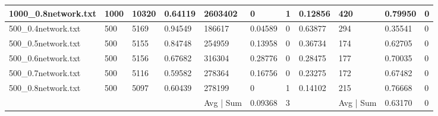 \begin{sidewaystable}
\begin{tabular}{lllllllllll}
		\multicolumn{1}{|l|}{1000\_0.8network.txt} & \multicolumn{1}{l|}{1000} & \multicolumn{1}{l|}{10320} & \multicolumn{1}{l|}{0.64119} & \multicolumn{1}{l|}{2603402} & \multicolumn{1}{l|}{0}       & \multicolumn{1}{l|}{1}       & \multicolumn{1}{l|}{0.12856} & \multicolumn{1}{l|}{420}   & \multicolumn{1}{l|}{0.79950} & \multicolumn{1}{l|}{0}       \\ \hline
		\multicolumn{1}{|l|}{500\_0.4network.txt}  & \multicolumn{1}{l|}{500}  & \multicolumn{1}{l|}{5169}  & \multicolumn{1}{l|}{0.94549} & \multicolumn{1}{l|}{186617}  & \multicolumn{1}{l|}{0.04589} & \multicolumn{1}{l|}{0}       & \multicolumn{1}{l|}{0.63877} & \multicolumn{1}{l|}{294}   & \multicolumn{1}{l|}{0.35541} & \multicolumn{1}{l|}{0}       \\ \hline
		\multicolumn{1}{|l|}{500\_0.5network.txt}  & \multicolumn{1}{l|}{500}  & \multicolumn{1}{l|}{5155}  & \multicolumn{1}{l|}{0.84748} & \multicolumn{1}{l|}{254959}  & \multicolumn{1}{l|}{0.13958} & \multicolumn{1}{l|}{0}       & \multicolumn{1}{l|}{0.36734} & \multicolumn{1}{l|}{174}   & \multicolumn{1}{l|}{0.62705} & \multicolumn{1}{l|}{0}       \\ \hline
		\multicolumn{1}{|l|}{500\_0.6network.txt}  & \multicolumn{1}{l|}{500}  & \multicolumn{1}{l|}{5156}  & \multicolumn{1}{l|}{0.67682} & \multicolumn{1}{l|}{316304}  & \multicolumn{1}{l|}{0.28776} & \multicolumn{1}{l|}{0}       & \multicolumn{1}{l|}{0.28475} & \multicolumn{1}{l|}{177}   & \multicolumn{1}{l|}{0.70035} & \multicolumn{1}{l|}{0}       \\ \hline
		\multicolumn{1}{|l|}{500\_0.7network.txt}  & \multicolumn{1}{l|}{500}  & \multicolumn{1}{l|}{5116}  & \multicolumn{1}{l|}{0.59582} & \multicolumn{1}{l|}{278364}  & \multicolumn{1}{l|}{0.16756} & \multicolumn{1}{l|}{0}       & \multicolumn{1}{l|}{0.23275} & \multicolumn{1}{l|}{172}   & \multicolumn{1}{l|}{0.67482} & \multicolumn{1}{l|}{0}       \\ \hline
		\multicolumn{1}{|l|}{500\_0.8network.txt}  & \multicolumn{1}{l|}{500}  & \multicolumn{1}{l|}{5097}  & \multicolumn{1}{l|}{0.60439} & \multicolumn{1}{l|}{278199}  & \multicolumn{1}{l|}{0}       & \multicolumn{1}{l|}{1}       & \multicolumn{1}{l|}{0.14102} & \multicolumn{1}{l|}{215}   & \multicolumn{1}{l|}{0.76668} & \multicolumn{1}{l|}{0}       \\ \hline
		&                           &                            &                              & Avg | Sum                    & 0.09368                      & 3                            &                              & Avg | Sum                  & 0.63170                      & 0                           

\end{tabular}
\end{sidewaystable}
